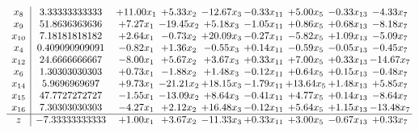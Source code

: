 \documentclass[9pt]{article}
\begin{document}
\[\begin{array}{c| c c@{\hskip 2pt} c@{\hskip 2pt} c@{\hskip 2pt} c@{\hskip 2pt} c@{\hskip 2pt} c@{\hskip 2pt} c@{\hskip 2pt} }
 x_{8}   &  3.33333333333 & + 11.00 x_{1} & +  5.33 x_{2} & -12.67 x_{3} & -0.33 x_{11} & +  5.00 x_{5} & -0.33 x_{13} & -4.33 x_{7}\\
 x_{9}   &  51.8636363636 & +  7.27 x_{1} & -19.45 x_{2} & +  5.18 x_{3} & -1.05 x_{11} & +  0.86 x_{5} & +  0.68 x_{13} & -8.18 x_{7}\\
 x_{10}   &  7.18181818182 & +  2.64 x_{1} & -0.73 x_{2} & + 20.09 x_{3} & -0.27 x_{11} & -5.82 x_{5} & +  1.09 x_{13} & -5.09 x_{7}\\
 x_{4}   &  0.409090909091 & -0.82 x_{1} & +  1.36 x_{2} & -0.55 x_{3} & +  0.14 x_{11} & -0.59 x_{5} & -0.05 x_{13} & -0.45 x_{7}\\
 x_{12}   &  24.6666666667 & -8.00 x_{1} & +  5.67 x_{2} & +  3.67 x_{3} & +  0.33 x_{11} & +  7.00 x_{5} & +  0.33 x_{13} & -14.67 x_{7}\\
 x_{6}   &  1.30303030303 & +  0.73 x_{1} & -1.88 x_{2} & +  1.48 x_{3} & -0.12 x_{11} & +  0.64 x_{5} & +  0.15 x_{13} & -0.48 x_{7}\\
 x_{14}   &  5.9696969697 & +  9.73 x_{1} & -21.21 x_{2} & + 18.15 x_{3} & -1.79 x_{11} & + 13.64 x_{5} & +  1.48 x_{13} & +  5.85 x_{7}\\
 x_{15}   &  47.7727272727 & -1.55 x_{1} & -13.09 x_{2} & +  8.64 x_{3} & -0.41 x_{11} & +  4.77 x_{5} & +  0.14 x_{13} & -8.64 x_{7}\\
 x_{16}   &  7.30303030303 & -4.27 x_{1} & +  2.12 x_{2} & + 16.48 x_{3} & -0.12 x_{11} & +  5.64 x_{5} & +  1.15 x_{13} & -13.48 x_{7}\\
\hline
z    &  -7.33333333333 & +  1.00 x_{1} & +  3.67 x_{2} & -11.33 x_{3} & +  0.33 x_{11} & +  3.00 x_{5} & -0.67 x_{13} & +  0.33 x_{7}\\
\end{array}\]
\end{document}
